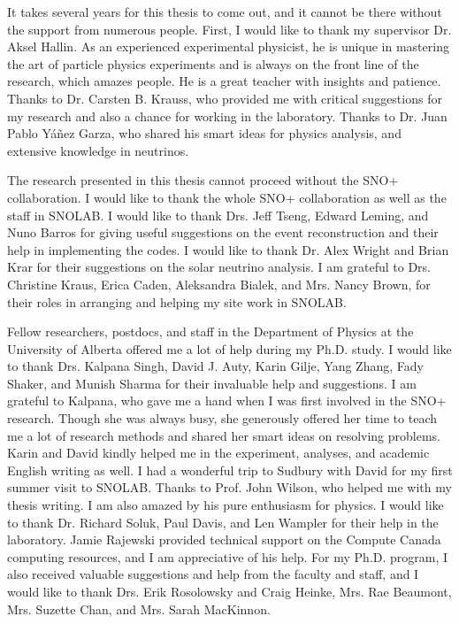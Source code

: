 It takes several years for this thesis to come out, and it cannot be there without the support from numerous people. First, I would like to thank my supervisor Dr. Aksel Hallin. As an experienced experimental physicist, he is unique in mastering the art of particle physics experiments and is always on the front line of the research, which amazes people. He is a great teacher with insights and patience. Thanks to Dr. Carsten B. Krauss, who provided me with critical suggestions for my research and also a chance for working in the laboratory. Thanks to Dr. Juan Pablo Y\'{a}\~{n}ez Garza, who shared his smart ideas for physics analysis, and extensive knowledge in neutrinos.

The research presented in this thesis cannot proceed without the SNO+ collaboration. I would like to thank the whole SNO+ collaboration as well as the staff in SNOLAB. I would like to thank Drs. Jeff Tseng, Edward Leming, and Nuno Barros for giving useful suggestions on the event reconstruction and their help in implementing the codes. I would like to thank Dr. Alex Wright and Brian Krar for their suggestions on the solar neutrino analysis. I am grateful to Drs. Christine Kraus, Erica Caden, Aleksandra Bialek, and Mrs. Nancy Brown, for their roles in arranging and helping my site work in SNOLAB.

Fellow researchers, postdocs, and staff in the Department of Physics at the University of Alberta offered me a lot of help during my Ph.D. study. I would like to thank Drs. Kalpana Singh, David J. Auty, Karin Gilje, Yang Zhang, Fady Shaker, and Munish Sharma for their invaluable help and suggestions. I am grateful to Kalpana, who gave me a hand when I was first involved in the SNO+ research. Though she was always busy, she generously offered her time to teach me a lot of research methods and shared her smart ideas on resolving problems. Karin and David kindly helped me in the experiment, analyses, and academic English writing as well. I had a wonderful trip to Sudbury with David for my first summer visit to SNOLAB. Thanks to Prof. John Wilson, who helped me with my thesis writing. I am also amazed by his pure enthusiasm for physics. I would like to thank Dr. Richard Soluk, Paul Davis, and Len Wampler for their help in the laboratory. Jamie Rajewski provided technical support on the Compute Canada computing resources, and I am appreciative of his help. For my Ph.D. program, I also received valuable suggestions and help from the faculty and staff, and I would like to thank Drs. Erik Rosolowsky and Craig Heinke, Mrs. Rae Beaumont, Mrs. Suzette Chan, and Mrs. Sarah MacKinnon.

